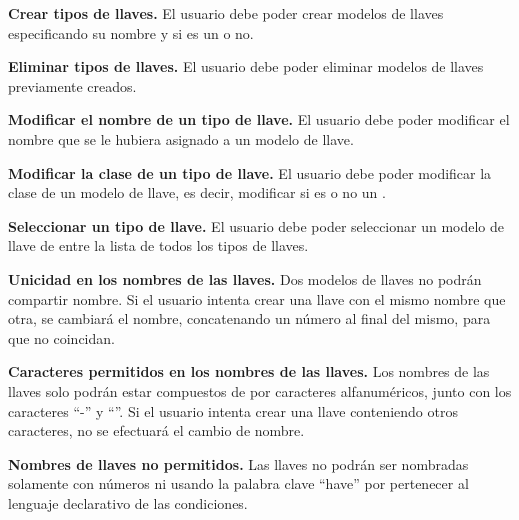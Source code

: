 	\item \textbf{Crear tipos de llaves.}\newline
		El usuario debe poder crear modelos de llaves especificando su nombre y si es un  o no.
	\item \textbf{Eliminar tipos de llaves.}\newline
		El usuario debe poder eliminar modelos de llaves previamente creados.
	\item \textbf{Modificar el nombre de un tipo de llave.}\newline
		El usuario debe poder modificar el nombre que se le hubiera asignado a un modelo de llave.
	\item \textbf{Modificar la clase de un tipo de llave.}\newline
		El usuario debe poder modificar la clase de un modelo de llave, es decir, modificar si es o no un .
	\item \textbf{Seleccionar un tipo de llave.}\newline
		El usuario debe poder seleccionar un modelo de llave de entre la lista de todos los tipos de llaves.
	\item \textbf{Unicidad en los nombres de las llaves.}\newline
		Dos modelos de llaves no podrán compartir nombre. Si el usuario intenta crear una llave con el mismo nombre que otra, se cambiará el nombre, concatenando un número al final del mismo, para que no coincidan.
	\item \textbf{Caracteres permitidos en los nombres de las llaves.}\newline
		Los nombres de las llaves solo podrán estar compuestos de por caracteres alfanuméricos, junto con los caracteres ``-'' y ``\textunderscore''. Si el usuario intenta crear una llave conteniendo otros caracteres, no se efectuará el cambio de nombre. 
	\item \textbf{Nombres de llaves no permitidos.}\newline
		Las llaves no podrán ser nombradas solamente con números ni usando la palabra clave ``have'' por pertenecer al lenguaje declarativo de las condiciones.
